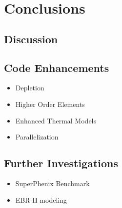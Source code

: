 \chapter{Conclusions}
\label{ch:conclusions}

\section{Discussion}

\section{Code Enhancements}
  \begin{itemize}
    \item Depletion
    \item Higher Order Elements
    \item Enhanced Thermal Models
    \item Parallelization
  \end{itemize}

\section{Further Investigations}
  \begin{itemize}
    \item SuperPhenix Benchmark
    \item EBR-II modeling
  \end{itemize}
